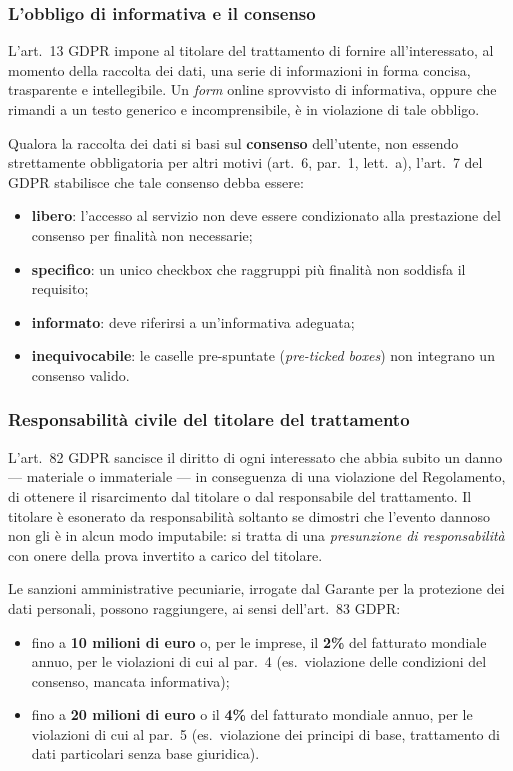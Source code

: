\documentclass[12pt, a4paper]{article}
\begin{document}
\subsubsection{L'obbligo di informativa e il consenso}
\label{subsub:consenso}

L'art.~13 GDPR impone al titolare del trattamento di fornire all'interessato,
al momento della raccolta dei dati, una serie di informazioni in forma
concisa, trasparente e intellegibile. Un \emph{form} online sprovvisto di
informativa, oppure che rimandi a un testo generico e incomprensibile, è in
violazione di tale obbligo.

Qualora la raccolta dei dati si basi sul \textbf{consenso} dell'utente, non essendo strettamente 
obbligatoria per altri motivi (art.~6, par.~1, lett.~a), 
l'art.~7 del GDPR stabilisce che tale consenso debba essere:

\begin{itemize}[leftmargin=1.5cm]
  \item \textbf{libero}: l'accesso al servizio non deve essere condizionato alla
        prestazione del consenso per finalità non necessarie;
  \item \textbf{specifico}: un unico checkbox che raggruppi più finalità non
        soddisfa il requisito;
  \item \textbf{informato}: deve riferirsi a un'informativa adeguata;
  \item \textbf{inequivocabile}: le caselle pre-spuntate (\emph{pre-ticked boxes})
        non integrano un consenso valido.
\end{itemize}

\subsubsection{Responsabilità civile del titolare del trattamento}
\label{subsub:responsabilitacivile}

L'art.~82 GDPR sancisce il diritto di ogni interessato che abbia subito
un danno --- materiale o immateriale --- in conseguenza di una violazione del
Regolamento, di ottenere il risarcimento dal titolare o dal responsabile del
trattamento. Il titolare è esonerato da responsabilità soltanto se dimostri
che l'evento dannoso non gli è in alcun modo imputabile: si tratta di una
\emph{presunzione di responsabilità} con onere della prova invertito a carico
del titolare.

Le sanzioni amministrative pecuniarie, irrogate dal Garante per la protezione
dei dati personali, possono raggiungere, ai sensi dell'art.~83 GDPR:
\begin{itemize}[leftmargin=1.5cm]
  \item fino a \textbf{10 milioni di euro} o, per le imprese, il \textbf{2\%}
        del fatturato mondiale annuo, per le violazioni di cui al par.~4
        (es.\ violazione delle condizioni del consenso, mancata informativa);
  \item fino a \textbf{20 milioni di euro} o il \textbf{4\%} del fatturato
        mondiale annuo, per le violazioni di cui al par.~5 (es.\ violazione
        dei principi di base, trattamento di dati particolari senza base giuridica).
\end{itemize}
\end{document}
